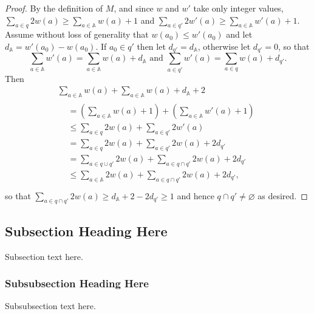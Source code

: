 \documentclass[journal]{IEEEtran}
\begin{document}
\begin{proof} By the definition of $M$, and since $w$ and $w'$ take only
integer values,
%
$\sum_{a \in q} 2 w(a) \ge \sum_{a \in \mathbb A} w(a) + 1$
%
and
%
$\sum_{a \in q'} 2 w'(a) \ge \sum_{a \in \mathbb A} w'(a) + 1$.
%
Assume without loss of generality that $w(a_0) \le w'(a_0)$ and let $d_{\mathbb
A} = w'(a_0) - w(a_0)$. If $a_0 \in q'$ then let $d_{q'} = d_{\mathbb A}$,
otherwise let $d_{q'} = 0$, so that
%
\[\sum_{a \in \mathbb A} w'(a) = \sum_{a \in \mathbb A} w(a) + d_{\mathbb A}
%
\textrm{ and }
%
\sum_{a \in q'} w'(a) = \sum_{a \in q} w(a) + d_{q'}.\]
%
Then
\begin{gather*}
%
\sum_{a \in \mathbb A} w(a) + \sum_{a \in \mathbb A} w(a) + d_{\mathbb A} + 2 \\
%
\begin{aligned}
%
&= \left( \sum_{a \in \mathbb A} w(a)  + 1\right)
+  \left( \sum_{a \in \mathbb A} w'(a) + 1\right) \\
%
&\le \sum_{a \in q}  2w(a)
+    \sum_{a \in q'} 2w'(a) \\
%
&= \sum_{a \in q}  2w(a)
+  \sum_{a \in q'} 2w(a) + 2d_{q'}\\
%
&= \sum_{a \in q \cup q'} 2w(a)
+  \sum_{a \in q \cap q'} 2w(a) + 2d_{q'}\\
%
&\le \sum_{a \in \mathbb A} 2w(a)
+    \sum_{a \in q \cap q'} 2w(a) + 2d_{q'},\\
%
\end{aligned}\end{gather*} so that $\sum_{a \in q \cap q'} 2w(a) \ge d_{\mathbb
A} + 2 - 2d_{q'} \ge 1$ and hence $q \cap q' \ne \varnothing$ as desired.
\end{proof}

\subsection{Subsection Heading Here}
Subsection text here.


\subsubsection{Subsubsection Heading Here}
Subsubsection text here.
\end{document}

